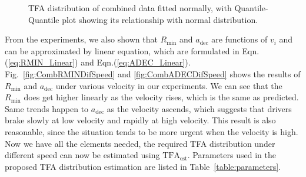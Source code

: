 \begin{figure}[htbp!]
    \centering
    \hfill
    \hfill
    \caption{TFA distribution of combined data fitted normally, with Quantile-Quantile plot showing its relationship with normal distribution. }
\label{fig:TFA_distr_combined} 
\end{figure}




From the experiments, we also shown that $R_{\mathrm{min}}$ and $a_{\mathrm{dec}}$ are functions of $v_i$ and can be approximated by linear equation, which are formulated in Eqn.(\ref{eq:RMIN_Linear}) and Eqn.(\ref{eq:ADEC_Linear}). Fig.~\ref{fig:CombRMINDifSpeed} and \ref{fig:CombADECDifSpeed} shows the results of $R_{\mathrm{min}}$ and $a_{\mathrm{dec}}$ under various velocity in our experiments. We can see that the $R_{\mathrm{min}}$ does get higher linearly as the velocity rises, which is the same as predicted. Same trends happen to $a_{\mathrm{dec}}$ as the velocity ascends, which suggests that drivers brake slowly at low velocity and rapidly at high velocity. This result is also reasonable, since the situation tends to be more urgent when the velocity is high. Now we have all the elements needed, the required TFA distribution under different speed can now be estimated using ${\mathrm{TFA}}_{\mathrm{est}}$. Parameters used in the proposed TFA distribution estimation are listed in Table~\ref{table:parameters}. 


